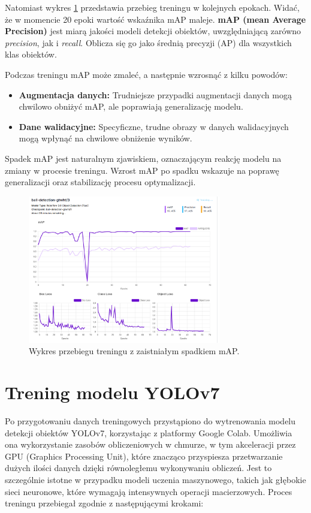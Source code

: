 \documentclass[a4paper,twoside,12pt]{book}
\begin{document}
\newpage
Natomiast wykres \ref{fig:Wykres2} przedstawia przebieg treningu w kolejnych epokach. Widać, że w momencie 20 epoki wartość wskaźnika mAP maleje. 
\textbf{mAP (mean Average Precision)} jest miarą jakości modeli detekcji obiektów, uwzględniającą zarówno \textit{precision}, jak i \textit{recall}. Oblicza się go jako średnią precyzji (AP) dla wszystkich klas obiektów.

Podczas treningu mAP może zmaleć, a następnie wzrosnąć z kilku powodów:
\begin{itemize}
    \item \textbf{Augmentacja danych:} Trudniejsze przypadki augmentacji danych mogą chwilowo obniżyć mAP, ale poprawiają generalizację modelu.
    \item \textbf{Dane walidacyjne:} Specyficzne, trudne obrazy w danych walidacyjnych mogą wpłynąć na chwilowe obniżenie wyników.
\end{itemize}

Spadek mAP jest naturalnym zjawiskiem, oznaczającym reakcję modelu na zmiany w procesie treningu. Wzrost mAP po spadku wskazuje na poprawę generalizacji oraz stabilizację procesu optymalizacji.

\begin{figure}[h]
    \centering
    \includegraphics[width=0.75\textwidth]{Images/Roboflow/wykres2.png}
    \caption{Wykres przebiegu treningu z zaistniałym spadkiem mAP.}
    \label{fig:Wykres2}
\end{figure}

\newpage

\section{Trening modelu YOLOv7}

Po przygotowaniu danych treningowych przystąpiono do wytrenowania modelu detekcji obiektów YOLOv7, korzystając z platformy Google Colab. Umożliwia ona wykorzystanie zasobów obliczeniowych w chmurze, w tym akceleracji przez GPU (Graphics Processing Unit), które znacząco przyspiesza przetwarzanie dużych ilości danych dzięki równoległemu wykonywaniu obliczeń. Jest to szczególnie istotne w przypadku modeli uczenia maszynowego, takich jak głębokie sieci neuronowe, które wymagają intensywnych operacji macierzowych. Proces treningu przebiegał zgodnie z następującymi krokami:
\end{document}
